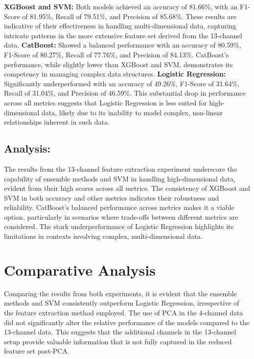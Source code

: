\documentclass[12pt, a4paper,oneside]{book}
\numberwithin{equation}{section}
\begin{document}
\textbf{XGBoost and SVM:} Both models achieved an accuracy of 81.66\%, with an F1-Score of 81.95\%, Recall of 79.51\%, and Precision of 85.68\%. These results are indicative of their effectiveness in handling multi-dimensional data, capturing intricate patterns in the more extensive feature set derived from the 13-channel data.\newline
\textbf{CatBoost:} Showed a balanced performance with an accuracy of 80.59\%, F1-Score of 80.27\%, Recall of 77.76\%, and Precision of 84.13\%. CatBoost’s performance, while slightly lower than XGBoost and SVM, demonstrates its competency in managing complex data structures.\newline
\textbf{Logistic Regression:} Significantly underperformed with an accuracy of 49.26\%, F1-Score of 31.64\%, Recall of 31.04\%, and Precision of 46.59\%. This substantial drop in performance across all metrics suggests that Logistic Regression is less suited for high-dimensional data, likely due to its inability to model complex, non-linear relationships inherent in such data.

\subsection{Analysis:}

The results from the 13-channel feature extraction experiment underscore the capability of ensemble methods and SVM in handling high-dimensional data, evident from their high scores across all metrics. The consistency of XGBoost and SVM in both accuracy and other metrics indicates their robustness and reliability. CatBoost’s balanced performance across metrics makes it a viable option, particularly in scenarios where trade-offs between different metrics are considered. The stark underperformance of Logistic Regression highlights its limitations in contexts involving complex, multi-dimensional data.

\section{Comparative Analysis}
Comparing the results from both experiments, it is evident that the ensemble methods and SVM consistently outperform Logistic Regression, irrespective of the feature extraction method employed. The use of PCA in the 4-channel data did not significantly alter the relative performance of the models compared to the 13-channel data. This suggests that the additional channels in the 13-channel setup provide valuable information that is not fully captured in the reduced feature set post-PCA.
\end{document}
